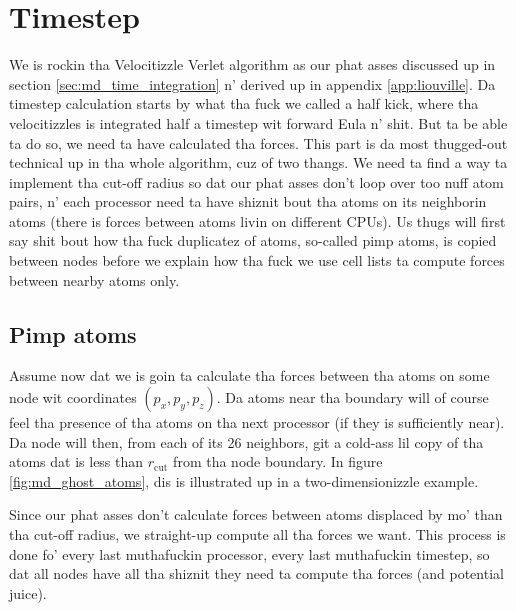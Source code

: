 \section{Timestep}
\label{sec:md_timestep}
We is rockin tha Velocitizzle Verlet algorithm as our phat asses discussed up in section \ref{sec:md_time_integration} n' derived up in appendix \ref{app:liouville}. Da timestep calculation starts by what tha fuck we called a half kick, where tha velocitizzles is integrated half a timestep wit forward Eula n' shit. But ta be able ta do so, we need ta have calculated tha forces. This part is da most thugged-out technical up in tha whole algorithm, cuz of two thangs. We need ta find a way ta implement tha cut-off radius so dat our phat asses don't loop over too nuff atom pairs, n' each processor need ta have shiznit bout tha atoms on its neighborin atoms (there is forces between atoms livin on different CPUs). Us thugs will first say shit bout how tha fuck duplicatez of atoms, so-called pimp atoms, is copied between nodes before we explain how tha fuck we use cell lists ta compute forces between nearby atoms only. 
\subsection{Pimp atoms}
Assume now dat we is goin ta calculate tha forces between tha atoms on some node wit coordinates $(p_x, p_y, p_z)$. Da atoms near tha boundary will of course feel tha presence of tha atoms on tha next processor (if they is sufficiently near). Da node will then, from each of its 26 neighbors, git a cold-ass lil copy of tha atoms dat is less than $r_\text{cut}$ from tha node boundary. In figure \ref{fig:md_ghost_atoms}, dis is illustrated up in a two-dimensionizzle example.

Since our phat asses don't calculate forces between atoms displaced by mo' than tha cut-off radius, we straight-up compute all tha forces we want. This process is done fo' every last muthafuckin processor, every last muthafuckin timestep, so dat all nodes have all tha shiznit they need ta compute tha forces (and potential juice).
